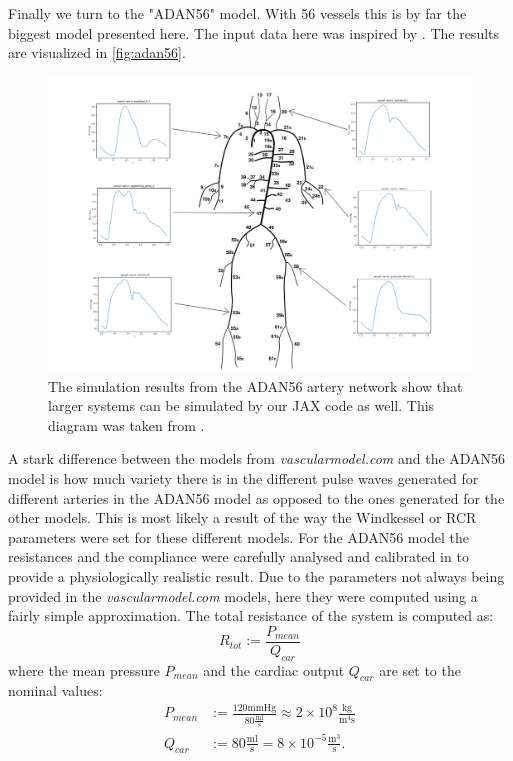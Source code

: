 \documentclass[a4paper, oneside]{discothesis}
\begin{document}
Finally we turn to the "ADAN56" model.
With 56 vessels this is by far the biggest model presented here.
The input data here was inspired by \cite{murgo1980aortic}.
The results are visualized in \autoref{fig:adan56}.
\begin{figure} [!ht]
	\centering
	\includegraphics[width=0.8\columnwidth]{figures/adan56_annotated.png}
	\caption{The simulation results from the ADAN56 artery network show that larger systems can be simulated by our JAX code as well. This diagram was taken from \cite{boil2015}.}
	\label{fig:adan56}
\end{figure}
A stark difference between the models from \emph{vascularmodel.com} and the ADAN56 model is how much variety there is in the different pulse waves generated for different arteries in the ADAN56 model as opposed to the ones generated for the other models.
This is most likely a result of the way the Windkessel or RCR parameters were set for these different models.
For the ADAN56 model the resistances and the compliance were carefully analysed and calibrated in \cite{blanco2014anatomically,blanco2014blood} to provide a physiologically realistic result.
Due to the parameters not always being provided in the \emph{vascularmodel.com} models, here they were computed using a fairly simple approximation.
The total resistance of the system is computed as:
\begin{equation}
	R_{tot} := \frac{P_{mean}}{Q_{car}}
\end{equation}
where the mean pressure $P_{mean}$ and the cardiac output $Q_{car}$ are set to the nominal values:
\begin{align}
	P_{mean} &:= \frac{120 \text{mmHg}}{80 \frac{\text{ml}}{\text{s}}} \approx 2 \times 10^8 \frac{\text{kg}}{\text{m}^4\text{s}} \\
	Q_{car} &:= 80 \frac{\text{ml}}{\text{s}} = 8 \times 10^{-5} \frac{\text{m}^3}{\text{s}}. \\
\end{align}
\end{document}
